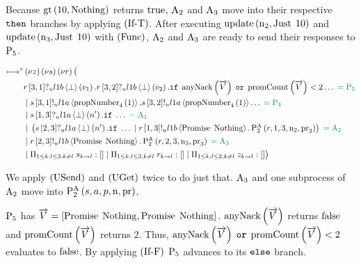 Because $\greaterThan{10}{\Nothing}$ returns $\True$, $\Acceptor{2}$ and $\Acceptor{3}$ move into their respective $\ThenName$ branches by applying $\RIfT$.
After executing $\update{\NumberRegister_2}{\Just{10}}$ and $\update{\NumberRegister_3}{\Just{10}}$ with $\RSideEffect$, $\Acceptor{2}$ and $\Acceptor{3}$ are ready to send their responses to $\Proposer{5}$.

\begin{align*}
\mapstostar& \NuChannels \big (\\
&
    \ReceiveUnreliableP{\ChannelR}{3}{1}{\LOneB}{\bot}{v_1}.
    \ReceiveUnreliableP{\ChannelR}{3}{2}{\LOneB}{\bot}{v_2}.
    \If \anyNack{\VectorV} \tOr \promiseCount{\VectorV} < 2\ldots
    \comment{= \Proposer{5}}\\
&\Or \SendUnreliableP{\ChannelS}{3}{1}{\LOneA}{\proposalNumber{1}{4}}.\SendUnreliableP{\ChannelS}{3}{2}{\LOneA}{\proposalNumber{1}{4}}\ldots \comment{= \Proposer{4}}\\
&\Or \ReceiveUnreliableP{\ChannelS}{1}{3}{\LOneA}{\bot}{n'}.\If \ldots \comment{= \Acceptor{1}}\\
&\Or \Paren{
    \ReceiveUnreliableP{\ChannelS}{2}{3}{\LOneA}{\bot}{n'}.\If \ldots
    \Or \SendUnreliableP{\ChannelR}{1}{3}{\LOneB}{\Promise{\Nothing}}.
        \PaTwo{\ChannelR, 1, 3, \NumberRegister_2, \ProposalRegister_2}
} \comment{= \Acceptor{2}}\\
&\Or
    \SendUnreliableP{\ChannelR}{2}{3}{\LOneB}{\Promise{\Nothing}}.
    \PaTwo{\ChannelR, 2, 3, \NumberRegister_3, \ProposalRegister_3}
    \comment{= \Acceptor{3}}\\
&\Or \InnerSessionQueues{\ChannelS}
\Or \InnerSessionQueues{\ChannelR}
\Or \OuterSessionQueues
\big )
\end{align*}

We apply $\RUsend$ and $\RUget$ twice to do just that.
$\Acceptor{3}$ and one subprocess of $\Acceptor{2}$ move into $\PaTwo{\SessionChannel, \AcceptorRole, \ProposerRole, \NumberRegister, \ProposalRegister}$.

$\Proposer{5}$ has $\VectorV = \Bracket{\Promise{\Nothing}, \Promise{\Nothing}}$.
$\anyNack{\VectorV}$ returns $\False$ and $\promiseCount{\VectorV}$ returns $2$.
Thus, $\anyNack{\VectorV} \tOr \promiseCount{\VectorV} < 2$ evaluates to $\False$.
By applying $\RIfF$ $\Proposer{5}$ advances to its $\ElseName$ branch.

